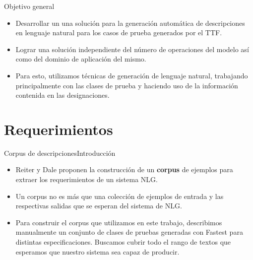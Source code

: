 \documentclass[pdf]{beamer}
\begin{document}
\begin{frame}{Objetivo general}{}
  \begin{itemize}
   
    \item Desarrollar un una solución para la generación automática de descripciones en lenguaje natural para los casos de prueba generados por el TTF.
    
    \vspace{0.4cm}
    \item Lograr una solución independiente del número de operaciones del modelo así como del dominio de aplicación del mismo. 
    
    \vspace{0.4cm}
    \item Para esto, utilizamos técnicas de generación de lenguaje natural, trabajando principalmente con las clases de prueba y haciendo uso de la información contenida en las designaciones. 
  
  \end{itemize}
\end{frame}
                                
\section{Requerimientos}
\begin{frame}{Corpus de descripciones}{Introducción}
  \begin{itemize}
    \item Reiter y Dale proponen la construcción de un \textbf{corpus} de ejemplos para extraer los requerimientos de un sistema NLG.
    \item Un corpus no es más que una colección de ejemplos de entrada y las respectivas salidas que se esperan del sistema de NLG. 
    \item Para construir el corpus que utilizamos en este trabajo, describimos manualmente un conjunto de clases de pruebas generadas con Fastest para distintas especificaciones. Buscamos cubrir todo el rango de textos que esperamos que nuestro sistema sea capaz de producir.
  \end{itemize}
\end{frame}
\end{document}
